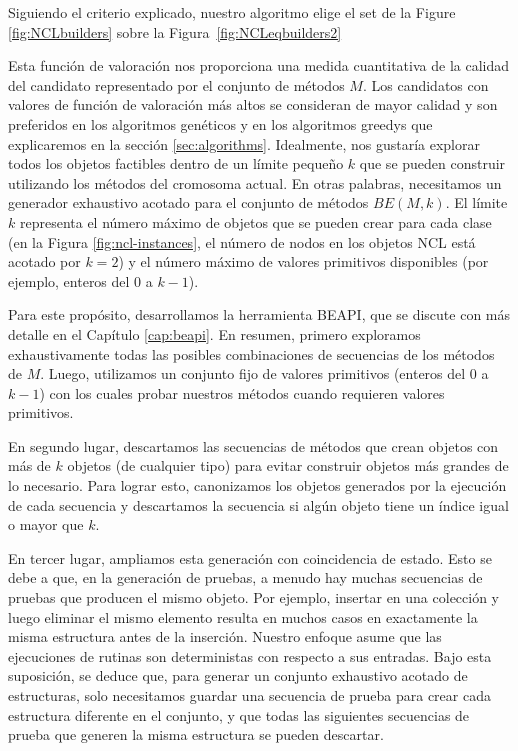 Siguiendo el criterio explicado, nuestro algoritmo elige el set de la Figure \ref{fig:NCLbuilders} sobre la Figura~\ref{fig:NCLeqbuilders2}

Esta función de valoración nos proporciona una medida cuantitativa de la calidad del candidato representado por el conjunto de métodos $M$. Los candidatos con valores de función de valoración más altos se consideran de mayor calidad y son preferidos en los algoritmos genéticos y en los algoritmos greedys que explicaremos en la sección \ref{sec:algorithms}.
Idealmente, nos gustaría explorar todos los objetos factibles dentro de un límite pequeño $k$ que se pueden construir utilizando los métodos del cromosoma actual. En otras palabras, necesitamos un generador exhaustivo acotado para el conjunto de métodos $BE(M, k)$. El límite $k$ representa el número máximo de objetos que se pueden crear para cada clase (en la Figura \ref{fig:ncl-instances}, el número de nodos en los objetos NCL está acotado por $k=2$) y el número máximo de valores primitivos disponibles (por ejemplo, enteros del 0 a $k-1$).

Para este propósito, desarrollamos la herramienta BEAPI, que se discute con más detalle en el Capítulo \ref{cap:beapi}. En resumen, primero exploramos exhaustivamente todas las posibles combinaciones de secuencias de los métodos de $M$. Luego, utilizamos un conjunto fijo de valores primitivos (enteros del 0 a $k-1$) con los cuales probar nuestros métodos cuando requieren valores primitivos.

En segundo lugar, descartamos las secuencias de métodos que crean objetos con más de $k$ objetos (de cualquier tipo) para evitar construir objetos más grandes de lo necesario. Para lograr esto, canonizamos los objetos generados por la ejecución de cada secuencia y descartamos la secuencia si algún objeto tiene un índice igual o mayor que $k$.

En tercer lugar, ampliamos esta generación con coincidencia de estado. Esto se debe a que, en la generación de pruebas, a menudo hay muchas secuencias de pruebas que producen el mismo objeto. Por ejemplo, insertar en una colección y luego eliminar el mismo elemento resulta en muchos casos en exactamente la misma estructura antes de la inserción. Nuestro enfoque asume que las ejecuciones de rutinas son deterministas con respecto a sus entradas. Bajo esta suposición, se deduce que, para generar un conjunto exhaustivo acotado de estructuras, solo necesitamos guardar una secuencia de prueba para crear cada estructura diferente en el conjunto, y que todas las siguientes secuencias de prueba que generen la misma estructura se pueden descartar.

